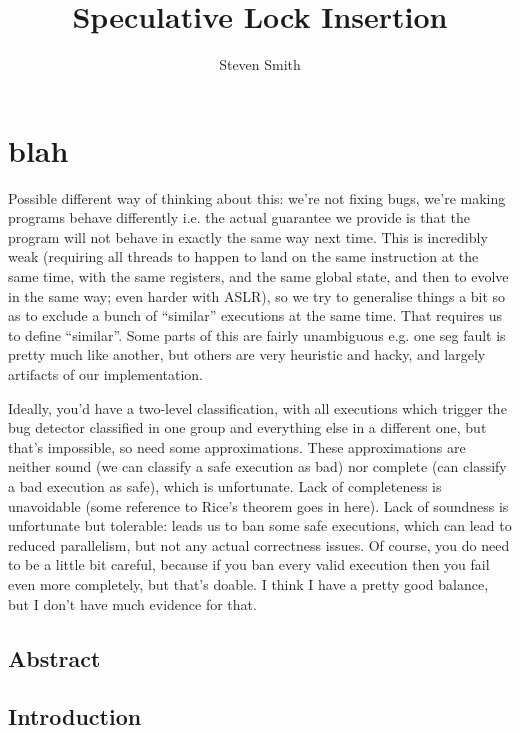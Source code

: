 \documentclass[10pt,a4paper]{report}
\title{Speculative Lock Insertion}
\author{Steven Smith}
\begin{document}
\newcommand{\editorial}[1]{\textcolor{red}{\footnote{\textcolor{red}{#1}}}}
\newcommand{\needCite}{\editorial{need cite}}
\maketitle

\chapter{blah}
Possible different way of thinking about this: we're not fixing bugs,
we're making programs behave differently i.e. the actual guarantee we
provide is that the program will not behave in exactly the same way
next time.  This is incredibly weak (requiring all threads to happen
to land on the same instruction at the same time, with the same
registers, and the same global state, and then to evolve in the same
way; even harder with ASLR), so we try to generalise things a bit so
as to exclude a bunch of ``similar'' executions at the same time.
That requires us to define ``similar''.  Some parts of this are fairly
unambiguous e.g. one seg fault is pretty much like another, but others
are very heuristic and hacky, and largely artifacts of our
implementation.

Ideally, you'd have a two-level classification, with all executions
which trigger the bug detector classified in one group and everything
else in a different one, but that's impossible, so need some
approximations.  These approximations are neither sound (we can
classify a safe execution as bad) nor complete (can classify a bad
execution as safe), which is unfortunate.  Lack of completeness is
unavoidable (some reference to Rice's theorem goes in here).  Lack of
soundness is unfortunate but tolerable: leads us to ban some safe
executions, which can lead to reduced parallelism, but not any actual
correctness issues.  Of course, you do need to be a little bit
careful, because if you ban every valid execution then you fail even
more completely, but that's doable.  I think I have a pretty good
balance, but I don't have much evidence for that.

\section{Abstract}
\section{Introduction}
\end{document}
